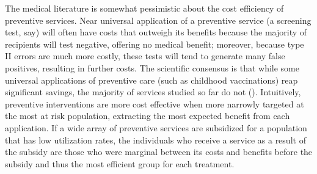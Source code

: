 \documentclass[12pt,pdftex,letterpaper]{article}
\begin{document}
The medical literature is somewhat pessimistic about the cost efficiency of preventive services.  Near universal application of a preventive service (a screening test, say) will often have costs that outweigh its benefits because the majority of recipients will test negative, offering no medical benefit; moreover, because type II errors are much more costly, these tests will tend to generate many false positives, resulting in further costs. The scientific consensus is that while some universal applications of preventive care (such as childhood vaccinations) reap significant savings, the majority of services studied so far do not (\cite{russell93,russell07,russell09}).  Intuitively, preventive interventions are more cost effective when more narrowly targeted at the most at risk population, extracting the most expected benefit from each application.  If a wide array of preventive services are subsidized for a population that has low utilization rates, the individuals who receive a service as a result of the subsidy are those who were marginal between its costs and benefits before the subsidy and thus the most efficient group for each treatment.
\end{document}
